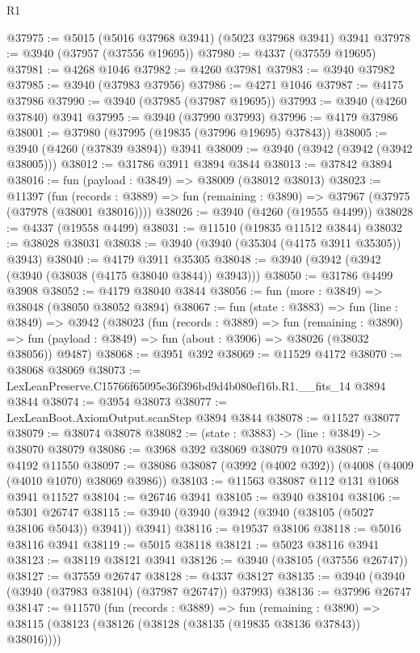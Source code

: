 \begin{lexlean}{R1}
\begin{coremodule}
@37975 := @5015 (@5016 @37968 @3941) (@5023 @37968 @3941) @3941
@37978 := @3940 (@37957 (@37556 @19695))
@37980 := @4337 (@37559 @19695)
@37981 := @4268 @1046
@37982 := @4260 @37981
@37983 := @3940 @37982
@37985 := @3940 (@37983 @37956)
@37986 := @4271 @1046
@37987 := @4175 @37986
@37990 := @3940 (@37985 (@37987 @19695))
@37993 := @3940 (@4260 @37840) @3941
@37995 := @3940 (@37990 @37993)
@37996 := @4179 @37986
@38001 := @37980 (@37995 (@19835 (@37996 @19695) @37843))
@38005 := @3940 (@4260 (@37839 @3894)) @3941
@38009 := @3940 (@3942 (@3942 (@3942 @38005)))
@38012 := @31786 @3911 @3894 @3844
@38013 := @37842 @3894
@38016 := fun (payload : @3849) => @38009 (@38012 @38013)
@38023 := @11397
    (fun (records : @3889) => fun (remaining : @3890) => @37967 (@37975 (@37978 (@38001 @38016))))
@38026 := @3940 (@4260 (@19555 @4499))
@38028 := @4337 (@19558 @4499)
@38031 := @11510 (@19835 @11512 @3844)
@38032 := @38028 @38031
@38038 := @3940 (@3940 (@35304 (@4175 @3911 @35305)) @3943)
@38040 := @4179 @3911 @35305
@38048 := @3940 (@3942 (@3942 (@3940 (@38038 (@4175 @38040 @3844)) @3943)))
@38050 := @31786 @4499 @3908
@38052 := @4179 @38040 @3844
@38056 := fun (more : @3849) => @38048 (@38050 @38052 @3894)
@38067 := fun (state : @3883) =>
  fun (line : @3849) =>
  @3942
    (@38023
      (fun (records : @3889) =>
      fun (remaining : @3890) =>
      fun (payload : @3849) => fun (about : @3906) => @38026 (@38032 @38056))
      @9487)
@38068 := @3951 @392
@38069 := @11529 @4172
@38070 := @38068 @38069
@38073 := LexLeanPreserve.C15766f65095e36f396bd9d4b080ef16b.R1.__fits_14 @3894 @3844
@38074 := @3954 @38073
@38077 := LexLeanBoot.AxiomOutput.scanStep @3894 @3844
@38078 := @11527 @38077
@38079 := @38074 @38078
@38082 := (state : @3883) -> (line : @3849) -> @38070 @38079
@38086 := @3968 @392 @38069 @38079 @1070
@38087 := @4192 @11550
@38097 := @38086 @38087 (@3992 (@4002 @392)) (@4008 (@4009 (@4010 @1070) @38069 @3986))
@38103 := @11563 @38087 @112 @131 @1068 @3941 @11527
@38104 := @26746 @3941
@38105 := @3940 @38104
@38106 := @5301 @26747
@38115 := @3940 (@3940 (@3942 (@3940 (@38105 (@5027 @38106 @5043)) @3941)) @3941)
@38116 := @19537 @38106
@38118 := @5016 @38116 @3941
@38119 := @5015 @38118
@38121 := @5023 @38116 @3941
@38123 := @38119 @38121 @3941
@38126 := @3940 (@38105 (@37556 @26747))
@38127 := @37559 @26747
@38128 := @4337 @38127
@38135 := @3940 (@3940 (@3940 (@37983 @38104) (@37987 @26747)) @37993)
@38136 := @37996 @26747
@38147 := @11570
    (fun (records : @3889) =>
    fun (remaining : @3890) =>
    @38115 (@38123 (@38126 (@38128 (@38135 (@19835 @38136 @37843)) @38016))))

\end{coremodule}
\end{lexlean}
